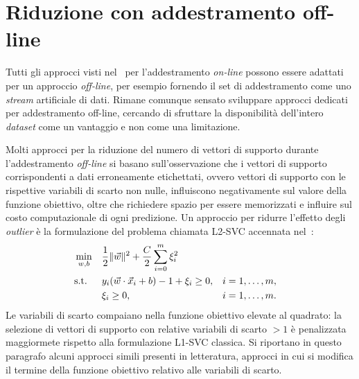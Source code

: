 \section{Riduzione con addestramento off-line}\label{sec:sparsesmv:off-line}
Tutti gli approcci visti nel~ per l'addestramento \emph{on-line} possono essere adattati per un approccio \emph{off-line}, per esempio fornendo il set di addestramento come uno \emph{stream} artificiale di dati.
Rimane comunque sensato sviluppare approcci dedicati per addestramento off-line, cercando di sfruttare la disponibilità dell'intero \emph{dataset} come un vantaggio e non come una limitazione.

Molti approcci per la riduzione del numero di vettori di supporto durante l'addestramento \emph{off-line} si basano sull'osservazione che i vettori di supporto corrispondenti a dati erroneamente etichettati, ovvero vettori di supporto con le rispettive variabili di scarto non nulle, influiscono negativamente sul valore della funzione obiettivo, oltre che richiedere spazio per essere memorizzati e influire sul costo computazionale di ogni predizione. 
Un approccio per ridurre l'effetto degli \emph{outlier} è la formulazione del problema chiamata L2-SVC accennata nel~:
\begin{equation}
\label{eq:l2svc}
\begin{aligned}
& \min_{w,b}    && \frac{1}{2}\|\Vec{w}\|^2 + \frac{C}{2}\sum_{i=0}^{m} \xi_i^2 \\
& \textrm{s.t.} && y_i(\Vec{w}\cdot \Vec{x}_i + b) - 1 + \xi_i \geq 0, && i=1,\dots,m, \\
&               && \xi_i \geq 0,  && i=1,\dots,m.
\end{aligned}
\end{equation}
Le variabili di scarto compaiano nella funzione obiettivo elevate al quadrato: 
la selezione di vettori di supporto con relative variabili di scarto $>1$ è penalizzata maggiormete rispetto alla formulazione L1-SVC classica.
Si riportano in questo paragrafo alcuni approcci simili presenti in letteratura, approcci in cui si modifica il termine della funzione obiettivo relativo alle variabili di scarto.

